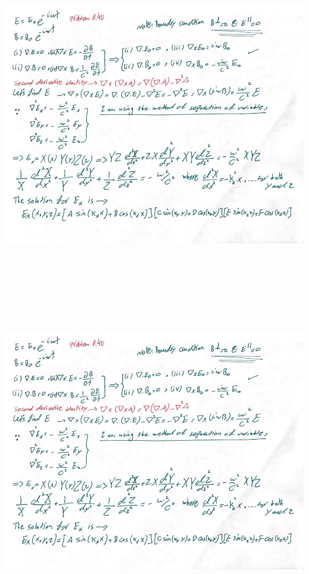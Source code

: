 \documentclass[fleqn]{article}
\begin{document}
\begin{enumerate}
    \pagebreak

    \begin{center}
      \includegraphics[height=14cm, width=16cm]{1.JPG}
    \end{center}

    \pagebreak

    \begin{center}
      \includegraphics[height=14cm, width=16cm]{1.JPG}
    \end{center}
    

  \end{enumerate}
\end{document}
